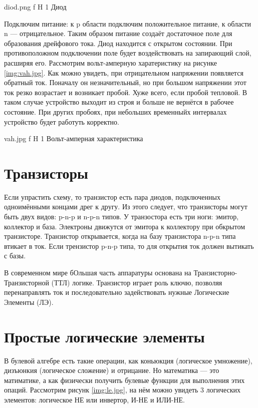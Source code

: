 \documentclass{bmstu}
\begin{document}
    {diod.png}
    {f}
    {H}
    {1\textwidth}
    {Диод}

Подключим питание: к p области подключим положительное питание, к области n --- отрицательное. 
Таким образом питание создаёт достаточное поле для образования дрейфового тока. Диод находится с открытом состоянии.
При противоположном подключении поле будет воздействовать на запирающий слой, расширяя его.
Рассмотрим вольт-амперную харатеристику на рисунке \ref{img:vah.jpg}. 
Как можно увидеть, при отрицательном напряжении появляется обратный ток. 
Поначалу он незначительный, но при большом напряжении этот ток резко возрастает и возникает пробой.
Хуже всего, если пробой тепловой. В таком случае устройство выходит из строя и больше не вернётся в рабочее состояние.
При других пробоях, при небольших временныйх интервалах устройство будет работуть корректно. 

    {vah.jpg}
    {f}
    {H}
    {1\textwidth}
    {Вольт-амперная характеристика}


\section{Транзисторы}

Если упрастить схему, то транзистор есть пара диодов, подключенных одноимёнными концами дрег к другу.
Из этого следует, что транзисторы могут быть двух видов: p-n-p и n-p-n типов.
У транзостора есть три ноги: эмитор, коллектор и база. 
Электроны движутся от эмитора к коллектору при обкрытом транзисторе.
Транзистор открывается, когда на базу транзистора n-p-n типа втикает в ток. 
Если трензистор p-n-p типа, то для открытия ток должен вытикать с базы.  

В современном мире бОльшая часть аппаратуры основана на Транзисторно-Транзисторной (ТТЛ) логике.
Транзистор играет роль ключю, позволяя перенаправлять ток и последовательно задействовать нужные Логические Элементы (ЛЭ).

\section{Простые логические элементы}

В булевой алгебре есть такие операции, как коньюкция (логическое умножение), дизъюнкия (логическое сложение) и отрицание. 
Но математика --- это матиматике, а как физически получить булевые функции для выполнения этих опаций.
Рассмотрим рисунк \ref{img:le.jpg}, на нём можно увидеть 3 логических элементов: логическое НЕ или инвертор, И-НЕ и ИЛИ-НЕ.
\end{document}
